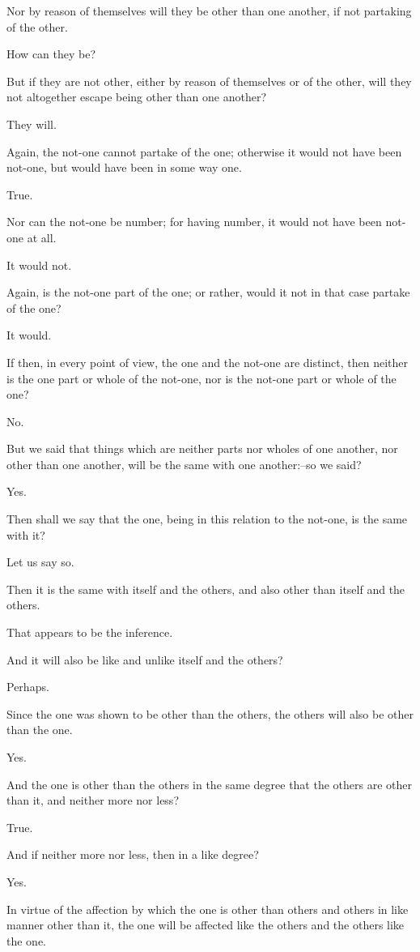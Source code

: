 Nor by reason of themselves will they be other than one another, if not
partaking of the other.

How can they be?

But if they are not other, either by reason of themselves or of the
other, will they not altogether escape being other than one another?

They will.

Again, the not-one cannot partake of the one; otherwise it would not
have been not-one, but would have been in some way one.

True.

Nor can the not-one be number; for having number, it would not have been
not-one at all.

It would not.

Again, is the not-one part of the one; or rather, would it not in that
case partake of the one?

It would.

If then, in every point of view, the one and the not-one are distinct,
then neither is the one part or whole of the not-one, nor is the not-one
part or whole of the one?

No.

But we said that things which are neither parts nor wholes of one
another, nor other than one another, will be the same with one
another:--so we said?

Yes.

Then shall we say that the one, being in this relation to the not-one,
is the same with it?

Let us say so.

Then it is the same with itself and the others, and also other than
itself and the others.

That appears to be the inference.

And it will also be like and unlike itself and the others?

Perhaps.

Since the one was shown to be other than the others, the others will
also be other than the one.

Yes.

And the one is other than the others in the same degree that the others
are other than it, and neither more nor less?

True.

And if neither more nor less, then in a like degree?

Yes.

In virtue of the affection by which the one is other than others and
others in like manner other than it, the one will be affected like the
others and the others like the one.

